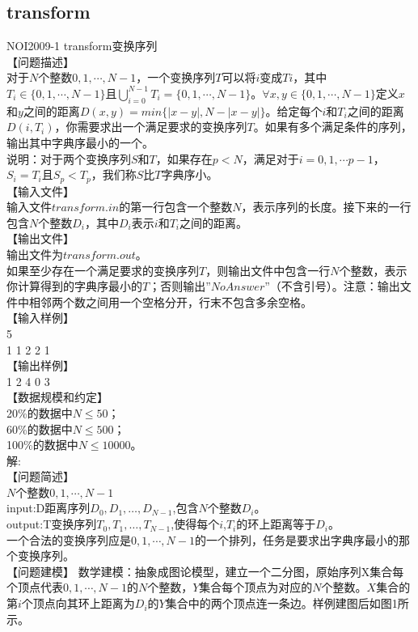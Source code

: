 \documentclass[12pt,twiside,a4paper]{ctexbook}
\numberwithin{chapter}{part}
\begin{document}
\subsection{transform}
NOI2009-1 transform变换序列\\
【问题描述】\\    
对于$N$个整数$0, 1,\cdots, N-1$，一个变换序列$T$可以将$i$变成$Ti$，其中$T_{i}\in\{0,1,\cdots,N-1\}$且$\bigcup_{i=0}^{N-1}{T_i}=\{0,1,\cdots,N-1\}$。$\forall x,y\in\{0,1,\cdots,N-1\}$定义$x$和$y$之间的距离$D(x,y) = min\{|x - y|, N - |x - y|\}$。给定每个$i$和$T_i$之间的距离$D(i,T_i)$，你需要求出一个满足要求的变换序列$T$。如果有多个满足条件的序列，输出其中字典序最小的一个。\\
说明：对于两个变换序列$S$和$T$，如果存在$p<N$，满足对于$i=0,1,\cdots p-1$，$S_i=T_i$且$S_p<T_p$，我们称$S$比$T$字典序小。\\
【输入文件】\\
输入文件$transform.in$的第一行包含一个整数$N$，表示序列的长度。接下来的一行包含$N$个整数$D_i$，其中$D_i$表示$i$和$T_i$之间的距离。\\
【输出文件】\\
输出文件为$transform.out$。\\
如果至少存在一个满足要求的变换序列$T$，则输出文件中包含一行$N$个整数，表示你计算得到的字典序最小的$T$；否则输出$”No Answer”$（不含引号）。注意：输出文件中相邻两个数之间用一个空格分开，行末不包含多余空格。\\
【输入样例】\\
5\\
1 1 2 2 1\\
【输出样例】\\
1 2 4 0 3\\
【数据规模和约定】\\
20\%的数据中$N\leq50$；\\
60\%的数据中$N\leq500$；\\
100\%的数据中$N\leq10000$。\\
解:\\
【问题简述】\\
$N$个整数$0,1,\cdots,N-1$\\
input:D距离序列$D_0,D_1,…,D_{N-1}$,包含$N$个整数$D_i$。\\
output:T变换序列$T_0,T_1,…,T_{N-1}$,使得每个$i$,$T_i$的环上距离等于$D_i$。\\
一个合法的变换序列应是$0,1,\cdots,N-1$的一个排列，任务是要求出字典序最小的那个变换序列。\\
【问题建模】
数学建模：抽象成图论模型，建立一个二分图，原始序列X集合每个顶点代表$0,1,\cdots,N-1$的$N$个整数，$Y$集合每个顶点为对应的$N$个整数。$X$集合的第$i$个顶点向其环上距离为$D_i$的$Y$集合中的两个顶点连一条边。样例建图后如图1所示。\\
\end{document}

